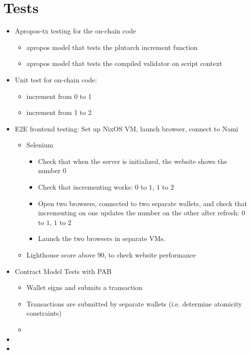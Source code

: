 \documentclass{article}
\begin{document}
\section{Tests}

\begin{itemize}
  \item Apropos-tx testing for the on-chain code
  \begin{itemize}
    \item apropos model that tests the plutarch increment function
    \item apropos model that tests the compiled validator on script context
  \end{itemize}
  \item Unit test for on-chain code:
  \begin{itemize}
    \item increment from 0 to 1
    \item increment from 1 to 2
  \end{itemize}
  \item E2E frontend testing: Set up NixOS VM, launch browser, connect to Nami
  \begin{itemize}
    \item Selenium
      \begin{itemize}
        \item Check that when the server is initialized, the website shows the
          number $0$
        \item Check that incrementing works: $0$ to $1$, $1$ to $2$
        \item Open two browsers, connected to two separate wallets, and check
          that incrementing on one updates the number on the other after
          refresh: $0$ to $1$, $1$ to $2$
        \item Launch the two browsers in separate VMs. 
      \end{itemize}
    \item Lighthouse score above $90$, to check website performance
  \end{itemize}
  \item Contract Model Tests with PAB
  \begin{itemize}
    \item Wallet signs and submits a transaction
    \item Transactions are submitted by separate wallets (i.e. determine
      atomicity constraints)
    \item {}
  \end{itemize}
  \item {}
  \item {}
\end{itemize}
\end{document}
